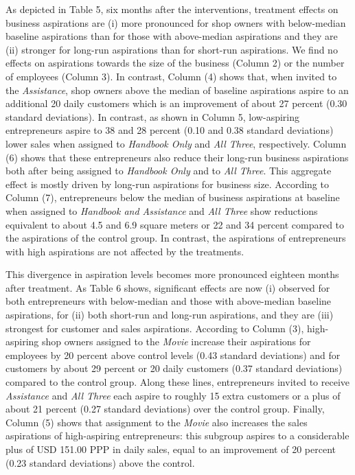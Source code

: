 \documentclass[11.5pt]{article}
\begin{document}
As depicted in Table 5, six months after the interventions, treatment effects on business aspirations are (i) more pronounced for shop owners with below-median baseline aspirations than for those with above-median aspirations and they are (ii) stronger for long-run aspirations than for short-run aspirations. We find no effects on aspirations towards the size of the business (Column 2) or the number of employees (Column 3). In contrast, Column (4) shows that, when invited to the \emph{Assistance}, shop owners above the median of baseline aspirations aspire to an additional 20 daily customers which is an improvement of about 27 percent (0.30 standard deviations). In contrast, as shown in Column 5, low-aspiring entrepreneurs aspire to 38 and 28 percent (0.10 and 0.38 standard deviations) lower sales when assigned to \emph{Handbook Only} and \emph{All Three}, respectively. Column (6) shows that these entrepreneurs also reduce their long-run business aspirations both after being assigned to \emph{Handbook Only} and to \emph{All Three}. This aggregate effect is mostly driven by long-run aspirations for business size. According to Column (7), entrepreneurs below the median of business aspirations at baseline when assigned to \emph{Handbook and Assistance} and \emph{All Three} show reductions equivalent to about 4.5 and 6.9 square meters or 22 and 34 percent compared to the aspirations of the control group. In contrast, the aspirations of entrepreneurs with high aspirations are not affected by the treatments.

This divergence in aspiration levels becomes more pronounced eighteen months after treatment. As Table 6 shows, significant effects are now (i) observed for both entrepreneurs with below-median and those with above-median baseline aspirations, for (ii) both short-run and long-run aspirations, and they are (iii) strongest for customer and sales aspirations. According to Column (3), high-aspiring shop owners assigned to the \emph{Movie} increase their aspirations for employees by 20 percent above control levels (0.43 standard deviations) and for customers by about 29 percent or 20 daily customers (0.37 standard deviations) compared to the control group. Along these lines, entrepreneurs invited to receive \emph{Assistance} and \emph{All Three} each aspire to roughly 15 extra customers or a plus of about 21 percent (0.27 standard deviations) over the control group. Finally, Column (5) shows that assignment to the \emph{Movie} also increases the sales aspirations of high-aspiring entrepreneurs: this subgroup aspires to a considerable plus of USD 151.00 PPP in daily sales, equal to an improvement of 20 percent (0.23 standard deviations) above the control.
\end{document}
